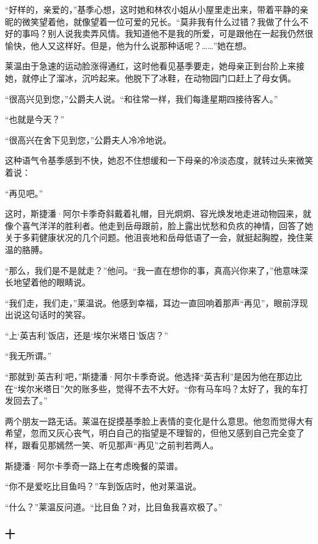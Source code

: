 \par “好样的，亲爱的，”基季心想，这时她和林农小姐从小屋里走出来，带着平静的亲昵的微笑望着他，就像望着一位可爱的兄长。“莫非我有什么过错？我做了什么不好的事吗？别人说我卖弄风情。我知道他不是我的所爱，可是跟他在一起我仍然很愉快，他人又这样好。但是，他为什么说那种话呢？……”她在想。
\par 莱温由于急速的运动脸涨得通红，这时他看见基季要走，她母亲正到台阶上来接她，就停止了溜冰，沉吟起来。他脱下了冰鞋，在动物园门口赶上了母女俩。
\par “很高兴见到您，”公爵夫人说。“和往常一样，我们每逢星期四接待客人。”
\par “也就是今天？”
\par “很高兴在舍下见到您，”公爵夫人冷冷地说。
\par 这种语气令基季感到不快，她忍不住想缓和一下母亲的冷淡态度，就转过头来微笑着说：
\par “再见吧。”
\par 这时，斯捷潘·阿尔卡季奇斜戴着礼帽，目光炯炯、容光焕发地走进动物园来，就像个喜气洋洋的胜利者。他走到岳母跟前，脸上露出忧愁和负疚的神情，回答了她关于多莉健康状况的几个问题。他沮丧地和岳母低语了一会，就挺起胸膛，挽住莱温的胳膊。
\par “那么，我们是不是就走？”他问。“我一直在想你的事，真高兴你来了，”他意味深长地望着他的眼睛说。
\par “我们走，我们走，”莱温说。他感到幸福，耳边一直回响着那声“再见”，眼前浮现出说这句话时的笑容。
\par “上‘英吉利’饭店，还是‘埃尔米塔日’饭店？”
\par “我无所谓。”
\par “那就到‘英吉利’吧，”斯捷潘·阿尔卡季奇说。他选择“英吉利”是因为他在那边比在“埃尔米塔日”欠的账多些，觉得不去不大好。“你有马车吗？太好了，我的车打发回去了。”
\par 两个朋友一路无话。莱温在捉摸基季脸上表情的变化是什么意思。他忽而觉得大有希望，忽而又灰心丧气，明白自己的指望是不理智的，但他又感到自己完全变了样，跟看见那嫣然一笑、听见那声“再见”之前判若两人。
\par 斯捷潘·阿尔卡季奇一路上在考虑晚餐的菜谱。
\par “你不是爱吃比目鱼吗？”车到饭店时，他对莱温说。
\par “什么？”莱温反问道。“比目鱼？对，比目鱼我喜欢极了。”

\subsubsection*{十}

